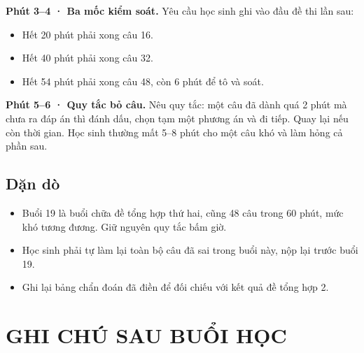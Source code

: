 \documentclass[11pt, a4paper]{article}
\begin{document}

\textbf{Phút 3–4 · Ba mốc kiểm soát.} Yêu cầu học sinh ghi vào đầu đề thi lần sau:

\begin{itemize}[leftmargin=1.4em, itemsep=2pt]
\item Hết 20 phút phải xong câu 16.
\item Hết 40 phút phải xong câu 32.
\item Hết 54 phút phải xong câu 48, còn 6 phút để tô và soát.
\end{itemize}

\textbf{Phút 5–6 · Quy tắc bỏ câu.} Nêu quy tắc: một câu đã dành quá 2 phút mà chưa ra đáp án thì đánh dấu, chọn tạm một phương án và đi tiếp. Quay lại nếu còn thời gian. Học sinh thường mất 5–8 phút cho một câu khó và làm hỏng cả phần sau.

\subsection{Dặn dò}

\begin{itemize}[leftmargin=1.4em, itemsep=2pt]
\item Buổi 19 là buổi chữa đề tổng hợp thứ hai, cũng 48 câu trong 60 phút, mức khó tương đương. Giữ nguyên quy tắc bấm giờ.
\item Học sinh phải tự làm lại toàn bộ câu đã sai trong buổi này, nộp lại trước buổi 19.
\item Ghi lại bảng chẩn đoán đã điền để đối chiếu với kết quả đề tổng hợp 2.
\end{itemize}

\section{GHI CHÚ SAU BUỔI HỌC}
\end{document}
